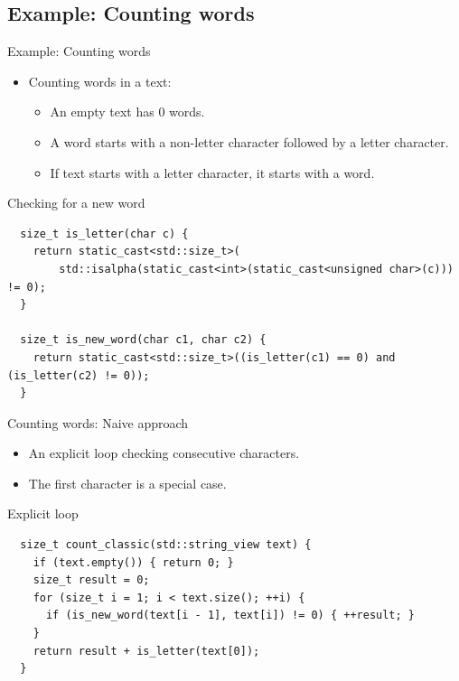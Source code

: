 \subsection{Example: Counting words}

\begin{frame}[t,fragile]{Example: Counting words}
\begin{itemize}
\item Counting words in a text:
    \begin{itemize}
        \item An empty text has 0 words.
        \item A word starts with a non-letter character followed by a letter character.
        \item If text starts with a letter character, it starts with a word.
    \end{itemize}
\end{itemize}

\begin{block}{Checking for a new word}
\begin{lstlisting}
  size_t is_letter(char c) {
    return static_cast<std::size_t>(
        std::isalpha(static_cast<int>(static_cast<unsigned char>(c))) != 0);
  }

  size_t is_new_word(char c1, char c2) {
    return static_cast<std::size_t>((is_letter(c1) == 0) and (is_letter(c2) != 0));
  }
\end{lstlisting}
\end{block}

\end{frame}

\begin{frame}[t,fragile]{Counting words: Naive approach}
    \begin{itemize}
        \item An explicit loop checking consecutive characters.
        \item The first character is a special case.
    \end{itemize}
\begin{block}{Explicit loop}
\begin{lstlisting}
  size_t count_classic(std::string_view text) {
    if (text.empty()) { return 0; }
    size_t result = 0;
    for (size_t i = 1; i < text.size(); ++i) {
      if (is_new_word(text[i - 1], text[i]) != 0) { ++result; }
    }
    return result + is_letter(text[0]);
  }
\end{lstlisting}
\end{block}
\end{frame}

